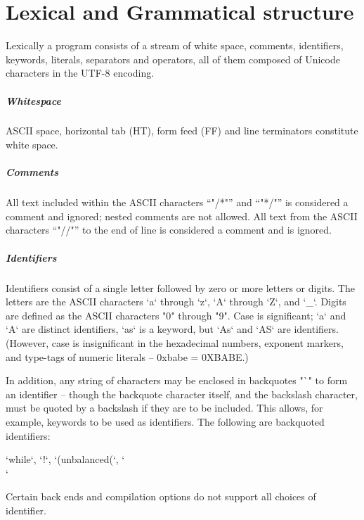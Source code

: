 \chapter{Lexical and Grammatical structure}


Lexically a program consists of a stream of white space, comments,
identifiers, keywords, literals, separators and operators, all of them
composed of Unicode characters in the UTF-8 encoding. 

\paragraph{Whitespace}
ASCII space, horizontal tab (HT), form feed (FF) and line
terminators constitute white space.

\paragraph{Comments}
All text included within the ASCII characters ``\xcd"/*"'' and
``\xcd"*/"'' is
considered a comment and ignored; nested comments are not
allowed.  All text from the ASCII characters
``\xcd"//"'' to the end of line is considered a comment and is ignored.

\paragraph{Identifiers}

Identifiers consist of a single letter followed by zero or more letters or
digits. The letters are the ASCII characters \xcd`a` through \xcd`z`, \xcd`A`
through \xcd`Z`, and \xcd`_`. Digits are defined as the ASCII characters
\xcd"0" through \xcd"9". Case is significant; \xcd`a` and \xcd`A` are distinct
identifiers, \xcd`as` is a keyword, but \xcd`As` and \xcd`AS` are identifiers.
(However, case is insignificant in the hexadecimal numbers, exponent markers,
and type-tags of numeric literals -- 0xbabe = 0XBABE.)

In addition, any string of characters may be enclosed in backquotes \xcd"`" to
form an identifier -- though the backquote character itself, and the backslash 
character, must be quoted by a backslash if they are to be included.
This allows,
for example, keywords to be used as identifiers.  The following are
backquoted identifiers: 
% 
\begin{xten}
`while`, `!`, `(unbalanced(`,  `\`\\`
\end{xten}
\noindent
Certain  back ends and compilation options do not support all choices of
identifier.  

